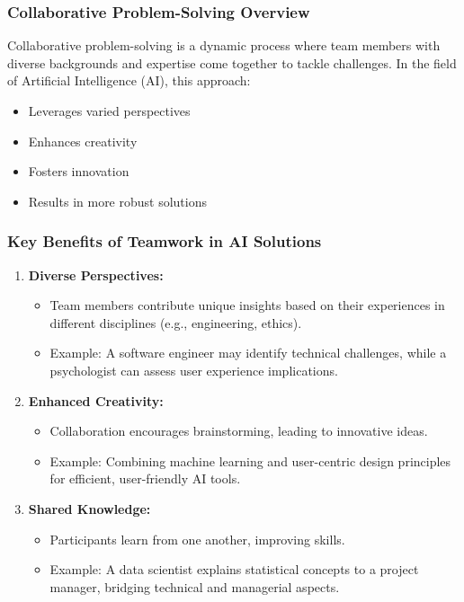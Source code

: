 \documentclass{beamer}
\begin{document}
\begin{frame}[fragile]
    \frametitle{Collaborative Problem-Solving Overview}
    Collaborative problem-solving is a dynamic process where team members with diverse backgrounds and expertise come together to tackle challenges. In the field of Artificial Intelligence (AI), this approach:
    \begin{itemize}
        \item Leverages varied perspectives
        \item Enhances creativity
        \item Fosters innovation
        \item Results in more robust solutions
    \end{itemize}
\end{frame}

\begin{frame}[fragile]
    \frametitle{Key Benefits of Teamwork in AI Solutions}
    \begin{enumerate}
        \item \textbf{Diverse Perspectives:}
            \begin{itemize}
                \item Team members contribute unique insights based on their experiences in different disciplines (e.g., engineering, ethics).
                \item Example: A software engineer may identify technical challenges, while a psychologist can assess user experience implications.
            \end{itemize}

        \item \textbf{Enhanced Creativity:}
            \begin{itemize}
                \item Collaboration encourages brainstorming, leading to innovative ideas.
                \item Example: Combining machine learning and user-centric design principles for efficient, user-friendly AI tools.
            \end{itemize}

        \item \textbf{Shared Knowledge:}
            \begin{itemize}
                \item Participants learn from one another, improving skills.
                \item Example: A data scientist explains statistical concepts to a project manager, bridging technical and managerial aspects.
            \end{itemize}


\end{enumerate}
\end{frame}
\end{document}
